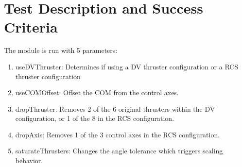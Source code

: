 
\section{Test Description and Success Criteria}
The module is run with 5 parameters:
\begin{enumerate}
\item useDVThruster: Determines if using a DV thruster configuration or a RCS thruster configuration
\item useCOMOffset: Offset the COM from the control axes. 
\item dropThruster: Removes 2 of the 6 original thrusters within the DV configuration, or 1 of the 8 in the RCS configuration.
\item dropAxis: Removes 1 of the 3 control axes in the RCS configuration.
\item saturateThrusters: Changes the angle tolerance which triggers scaling behavior.
\end{enumerate}

